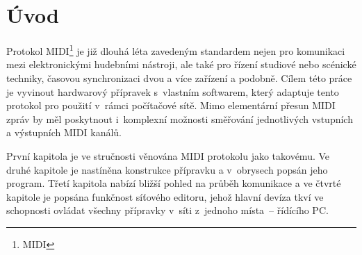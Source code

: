 {}
\chapter*{Úvod}

Protokol \acs{MIDI}\footnote{\acl{MIDI}} je již dlouhá léta zavedeným standardem nejen pro komunikaci mezi elektronickými hudebními nástroji, ale také pro řízení studiové nebo scénické techniky, časovou synchronizaci dvou a více zařízení a podobně. Cílem této práce je vyvinout hardwarový přípravek s~vlastním softwarem, který adaptuje tento protokol pro použití v~rámci počítačové sítě. Mimo elementární přesun \acs{MIDI} zpráv by měl poskytnout i~komplexní možnosti směřování jednotlivých vstupních a výstupních \acs{MIDI} kanálů.

První kapitola je ve stručnosti věnována \acs{MIDI} protokolu jako takovému. Ve druhé kapitole je nastíněna konstrukce přípravku a v~obrysech popsán jeho program. Třetí kapitola nabízí bližší pohled na průběh komunikace a ve čtvrté kapitole je popsána funkčnost síťového editoru, jehož hlavní devíza tkví ve schopnosti ovládat všechny přípravky v~síti z~jednoho místa~-- řídícího PC.
